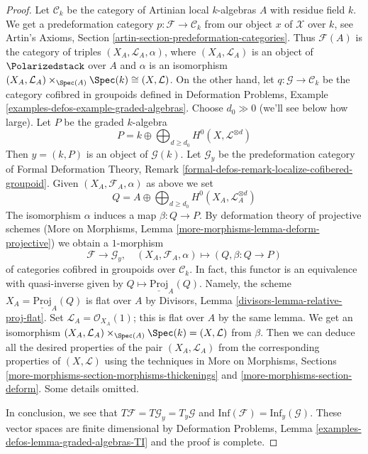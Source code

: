 \begin{proof}
\medskip\noindent
Let $\mathcal{C}_k$ be the category of Artinian local $k$-algebras
$A$ with residue field $k$. We get a predeformation category
$p : \mathcal{F} \to \mathcal{C}_k$ from our object $x$ of $\mathcal{X}$
over $k$, see
Artin's Axioms, Section \ref{artin-section-predeformation-categories}.
Thus $\mathcal{F}(A)$ is the category of triples
$(X_A, \mathcal{L}_A, \alpha)$, where $(X_A, \mathcal{L}_A)$
is an object of $\Polarizedstack$ over $A$ and $\alpha$ is an isomorphism
$(X_A, \mathcal{L}_A) \times_{\Spec(A)} \Spec(k) \cong (X, \mathcal{L})$.
On the other hand, let $q : \mathcal{G} \to \mathcal{C}_k$
be the category cofibred in groupoids defined in
Deformation Problems, Example \ref{examples-defos-example-graded-algebras}.
Choose $d_0 \gg 0$ (we'll see below how large).
Let $P$ be the graded $k$-algebra
$$
P = k \oplus \bigoplus\nolimits_{d \geq d_0} H^0(X, \mathcal{L}^{\otimes d})
$$
Then $y = (k, P)$ is an object of $\mathcal{G}(k)$.
Let $\mathcal{G}_y$ be the predeformation category of
Formal Deformation Theory, Remark
\ref{formal-defos-remark-localize-cofibered-groupoid}.
Given $(X_A, \mathcal{F}_A, \alpha)$ as above we set
$$
Q = A \oplus \bigoplus\nolimits_{d \geq d_0} H^0(X_A, \mathcal{L}_A^{\otimes d})
$$
The isomorphism $\alpha$ induces a map $\beta : Q \to P$.
By deformation theory of projective schemes
(More on Morphisms, Lemma \ref{more-morphisms-lemma-deform-projective})
we obtain a $1$-morphism
$$
\mathcal{F} \longrightarrow \mathcal{G}_y,\quad
(X_A, \mathcal{F}_A, \alpha) \longmapsto (Q, \beta : Q \to P)
$$
of categories cofibred in groupoids over $\mathcal{C}_k$.
In fact, this functor is an equivalence with quasi-inverse
given by $Q \mapsto \underline{\text{Proj}}_A(Q)$.
Namely, the scheme $X_A = \underline{\text{Proj}}_A(Q)$
is flat over $A$ by Divisors, Lemma \ref{divisors-lemma-relative-proj-flat}.
Set $\mathcal{L}_A = \mathcal{O}_{X_A}(1)$; this is flat over $A$
by the same lemma. We get an isomorphism
$(X_A, \mathcal{L}_A) \times_{\Spec(A)} \Spec(k) = (X, \mathcal{L})$
from $\beta$. Then we can deduce all the desired properties of
the pair $(X_A, \mathcal{L}_A)$ from the corresponding properties
of $(X, \mathcal{L})$ using the techniques in
More on Morphisms, Sections
\ref{more-morphisms-section-morphisms-thickenings} and
\ref{more-morphisms-section-deform}.
Some details omitted.

\medskip\noindent
In conclusion, we see that $T\mathcal{F} = T\mathcal{G}_y = T_y\mathcal{G}$
and $\text{Inf}(\mathcal{F}) = \text{Inf}_y(\mathcal{G})$.
These vector spaces are finite dimensional by Deformation Problems, Lemma
\ref{examples-defos-lemma-graded-algebras-TI}
and the proof is complete.
\end{proof}

